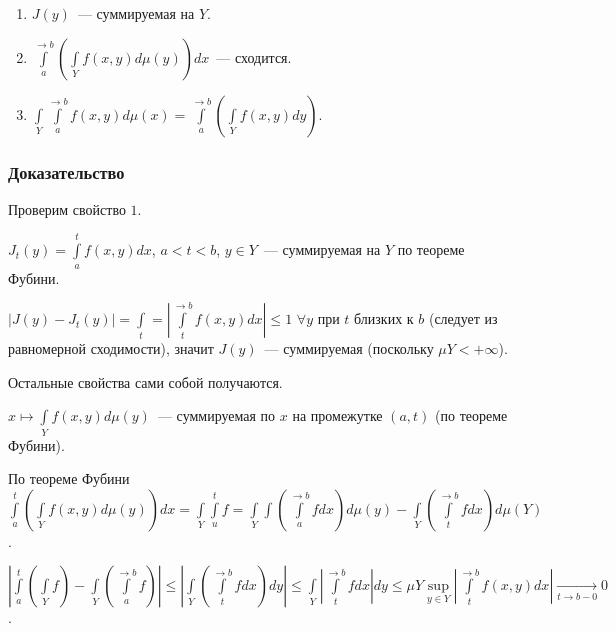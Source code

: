 \documentclass{article}
\begin{document}
        \begin{enumerate}
        
            \item $J(y)$~--- суммируемая на $Y$.
            
            \item $\int\limits^{\rightarrow b}_a \left( \int\limits_Y f(x, y) d \mu(y) \right) dx$~--- сходится.
            
            \item $\int\limits_Y \int\limits^{\rightarrow b}_a f(x, y) d \mu(x) = \int\limits^{\rightarrow b}_a \left( \int\limits_Y f(x, y) dy \right)$.
            
        \end{enumerate}
        
        \subsubsection{Доказательство}
        
            Проверим свойство $1$.
            
            $J_t(y) = \int\limits^t_a f(x, y) dx$, $a < t < b$, $y \in Y$~--- суммируемая на $Y$ по теореме Фубини.
            
            $\left| J(y) - J_t(y) \right| = \int\limits_t = \left| \int\limits^{\rightarrow b}_t f(x, y) dx \right| \leqslant 1$ $\forall y$ при $t$ близких к $b$ (следует из равномерной сходимости), значит $J(y)$~--- суммируемая (поскольку $\mu Y < +\infty$).
            
            Остальные свойства сами собой получаются.
            
            $x \mapsto \int\limits_Y f(x, y) d \mu(y)$~--- суммируемая по $x$ на промежутке $(a, t)$ (по теореме Фубини).
            
            По теореме Фубини $\int\limits^t_a \left( \int\limits_Y f(x, y) d \mu(y) \right) dx = \int\limits_Y \int\limits^t_u f = \int\limits_Y \int \left( \int\limits^{\rightarrow b}_a f dx \right) d \mu(y) - \int\limits_Y \left( \int\limits^{\rightarrow b}_t f dx \right) d \mu(Y)$.
            
            $\left| \int\limits^t_a \left( \int\limits_Y f \right) - \int\limits_Y \left( \int\limits^{\rightarrow b}_a f \right) \right| \leqslant \left| \int\limits_Y \left( \int\limits^{\rightarrow b}_t f dx \right) dy \right| \leqslant \int\limits_Y \left| \int\limits^{\rightarrow b}_t f dx \right| dy \leqslant \mu Y \sup\limits_{y \in Y} \left| \int\limits^{\rightarrow b}_t f(x, y) dx \right| \xrightarrow[t \rightarrow b - 0]{} 0$.
        
\end{document}

